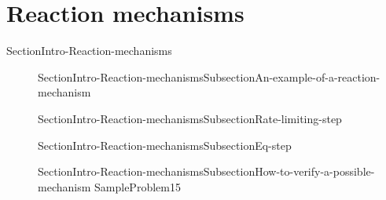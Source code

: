 \documentclass[main.tex]{subfiles}
\newcommand\chapterlabel{Ch-kinetics}\setcounter{figurenewcounter}{0}\setcounter{tablenewcounter}{0}\setcounter{formulanewcounter}{0}\chapterpicture{../{\chapterlabel}/figure1}\chapterpicturelabel{PxFuel}
\begin{document}
\section{Reaction mechanisms} {SectionIntro-Reaction-mechanisms}
\sloppy \begin{description}
\item[]  {SectionIntro-Reaction-mechanismsSubsectionAn-example-of-a-reaction-mechanism}
\item[] {SectionIntro-Reaction-mechanismsSubsectionRate-limiting-step}
\item[] {SectionIntro-Reaction-mechanismsSubsectionEq-step}
 \item[] {SectionIntro-Reaction-mechanismsSubsectionHow-to-verify-a-possible-mechanism}
  {SampleProblem15}
  \end{description}



\checkoddpage\ifoddpage \clearpage\thispagestyle{empty}\mbox{}\clearpage \else  \fi 
\end{document}
